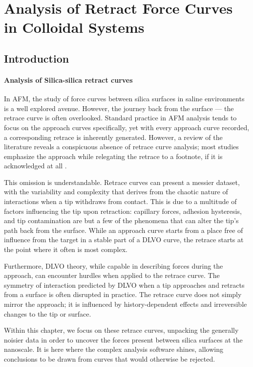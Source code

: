 \chapter{Analysis of Retract Force Curves in Colloidal Systems}

\section{Introduction}

\subsubsection{Analysis of Silica-silica retract curves}

In AFM, the study of force curves between silica surfaces in saline environments is a well explored avenue. However, the journey back from the surface — the retrace curve is often overlooked. Standard practice in AFM analysis tends to focus on the approach curves specifically, yet with every approach curve recorded, a corresponding retrace is inherently generated. However, a review of the literature reveals a conspicuous absence of retrace curve analysis; most studies emphasize the approach while relegating the retrace to a footnote, if it is acknowledged at all \cite{Retrace}. %

This omission is understandable. Retrace curves can present a messier dataset, with the variability and complexity that derives from the chaotic nature of interactions when a tip withdraws from contact. This is due to a multitude of factors influencing the tip upon retraction: capillary forces, adhesion hysteresis, and tip contamination are but a few of the phenomena that can alter the tip's path back from the surface. While an approach curve starts from a place free of influence from the target in a stable part of a DLVO curve, the retrace starts at the point where it often is most complex.

Furthermore, DLVO theory, while capable in describing forces during the approach, can encounter hurdles when applied to the retrace curve. The symmetry of interaction predicted by DLVO when a tip approaches and retracts from a surface is often disrupted in practice. The retrace curve does not simply mirror the approach; it is influenced by history-dependent effects and irreversible changes to the tip or surface.

Within this chapter, we focus on these retrace curves, unpacking the generally noisier data in order to uncover the forces present between silica surfaces at the nanoscale. It is here where the complex analysis software shines, allowing conclusions to be drawn from curves that would otherwise be rejected.

